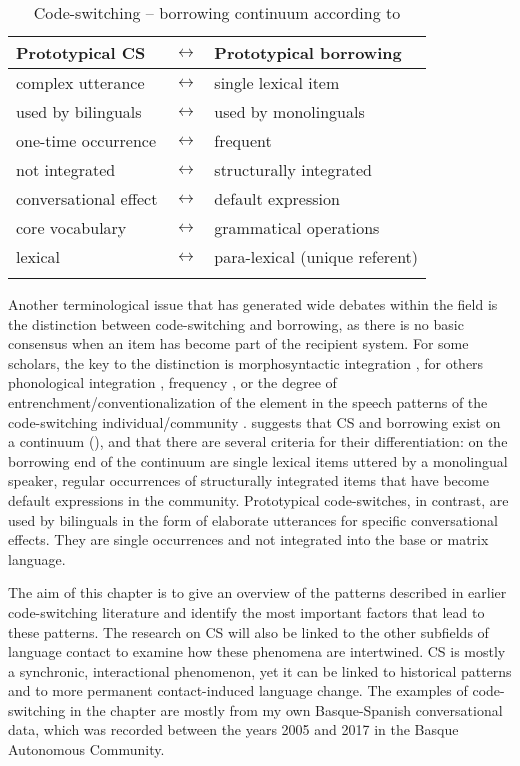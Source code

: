 \documentclass[output=paper]{langscibook}
\begin{document}
\begin{table}[b]
\caption{\label{tab:cs:matrascontinuum}Code-switching – borrowing continuum according to \textcite[111]{matras2009language}}
\label{continuum}
 \begin{tabular} {lcl}
  \lsptoprule
  Prototypical CS & $\leftrightarrow$ & Prototypical borrowing \\
  \midrule
complex utterance & $\leftrightarrow$ & single lexical item \\
used by bilinguals & $\leftrightarrow$ & used by monolinguals \\
one-time occurrence & $\leftrightarrow$ & frequent \\
not integrated & $\leftrightarrow$ & structurally integrated \\
conversational effect & $\leftrightarrow$ & default expression \\
core vocabulary & $\leftrightarrow$ & grammatical operations \\
lexical & $\leftrightarrow$ & para-lexical (unique referent) \\
\lspbottomrule
 \end{tabular}
\end{table}


Another terminological issue that has generated wide debates within the field is the distinction between code-switching and borrowing, as there is no basic consensus when an item has become part of the recipient system. For some scholars, the key to the distinction is morphosyntactic integration \parencite{poplack1998introduction}, for others phonological integration \parencite{halmari1997government}, frequency \parencite{myers1997duelling}, or the degree of entrenchment/conventionalization of the element in the speech patterns of the code-switching individual\slash community \parencite{backus2013usage}. \textcite{matras2009language} suggests that CS and borrowing exist on a continuum (), and that there are several criteria for their differentiation: on the borrowing end of the continuum are single lexical items uttered by a monolingual speaker, regular occurrences of structurally integrated items that have become default expressions in the community. Prototypical code-switches, in contrast, are used by bilinguals in the form of elaborate utterances for specific conversational effects. They are single occurrences and not integrated into the base or matrix language.


The aim of this chapter is to give an overview of the patterns described in earlier code-switching literature and identify the most important factors that lead to these patterns. The research on CS will also be linked to the other subfields of language contact to examine how these phenomena are intertwined. CS is mostly a synchronic, interactional phenomenon, yet it can be linked to historical patterns and to more permanent contact-induced language change. The examples of code-switching in the chapter are mostly from my own Basque-Spanish conversational data, which was recorded between the years 2005 and 2017 in the Basque Autonomous Community. 
\end{document}
